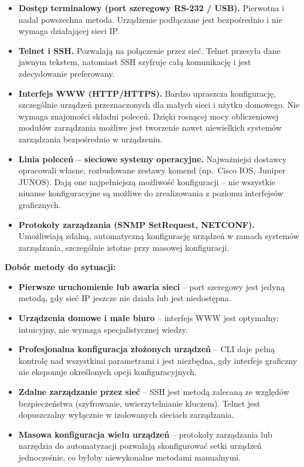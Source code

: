 \documentclass[12pt,a4paper]{article}
\begin{document}
\begin{itemize}
  \item \textbf{Dostęp terminalowy (port szeregowy RS-232 / USB).}
        Pierwotna i nadal powszechna metoda. Urządzenie podłączane jest
        bezpośrednio i nie wymaga działającej sieci IP.
  \item \textbf{Telnet i SSH.}
        Pozwalają na połączenie przez sieć. Telnet przesyła dane jawnym tekstem,
        natomiast SSH szyfruje całą komunikację i jest zdecydowanie preferowany.
  \item \textbf{Interfejs WWW (HTTP/HTTPS).}
        Bardzo upraszcza konfigurację, szczególnie urządzeń przeznaczonych dla
        małych sieci i użytku domowego. Nie wymaga znajomości składni poleceń.
        Dzięki rosnącej mocy obliczeniowej modułów zarządzania możliwe jest
        tworzenie nawet niewielkich systemów zarządzania bezpośrednio w urządzeniu.
  \item \textbf{Linia poleceń -- sieciowe systemy operacyjne.}
        Najważniejsi dostawcy opracowali własne, rozbudowane zestawy komend
        (np.\ Cisco IOS, Juniper JUNOS). Dają one najpełniejszą możliwość
        konfiguracji -- nie wszystkie niuanse konfiguracyjne są możliwe do
        zrealizowania z poziomu interfejsów graficznych.
  \item \textbf{Protokoły zarządzania (SNMP SetRequest, NETCONF).}
        Umożliwiają zdalną, automatyczną konfigurację urządzeń w ramach systemów
        zarządzania, szczególnie istotne przy masowej konfiguracji.
\end{itemize}

\textbf{Dobór metody do sytuacji:}

\begin{itemize}
  \item \textbf{Pierwsze uruchomienie lub awaria sieci} -- port szeregowy jest
        jedyną metodą, gdy sieć IP jeszcze nie działa lub jest niedostępna.
  \item \textbf{Urządzenia domowe i małe biuro} -- interfejs WWW jest
        optymalny: intuicyjny, nie wymaga specjalistycznej wiedzy.
  \item \textbf{Profesjonalna konfiguracja złożonych urządzeń} -- CLI daje
        pełną kontrolę nad wszystkimi parametrami i jest niezbędna, gdy interfejs
        graficzny nie eksponuje określonych opcji konfiguracyjnych.
  \item \textbf{Zdalne zarządzanie przez sieć} -- SSH jest metodą zalecaną
        ze względów bezpieczeństwa (szyfrowanie, uwierzytelnianie kluczem).
        Telnet jest dopuszczalny wyłącznie w izolowanych sieciach zarządzania.
  \item \textbf{Masowa konfiguracja wielu urządzeń} -- protokoły zarządzania
        lub narzędzia do automatyzacji pozwalają skonfigurować setki urządzeń
        jednocześnie, co byłoby niewykonalne metodami manualnymi.
\end{itemize}
\end{document}
